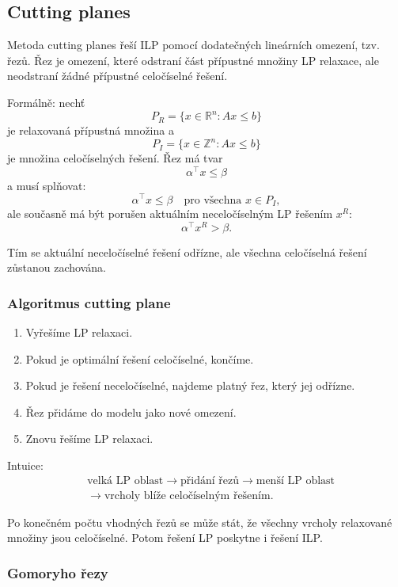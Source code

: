 \subsection{Cutting planes}

Metoda cutting planes řeší ILP pomocí dodatečných lineárních omezení, tzv. řezů. Řez je omezení,
které odstraní část přípustné množiny LP relaxace, ale neodstraní žádné přípustné celočíselné řešení.

Formálně: nechť
\[
P_R=\{x\in\mathbb{R}^n:Ax\le b\}
\]
je relaxovaná přípustná množina a
\[
P_I=\{x\in\mathbb{Z}^n:Ax\le b\}
\]
je množina celočíselných řešení. Řez má tvar
\[
\alpha^\top x\le \beta
\]
a musí splňovat:
\[
\alpha^\top x\le \beta \quad \text{pro všechna } x\in P_I,
\]
ale současně má být porušen aktuálním neceločíselným LP řešením $x^R$:
\[
\alpha^\top x^R> \beta.
\]

Tím se aktuální neceločíselné řešení odřízne, ale všechna celočíselná řešení zůstanou zachována.

\subsubsection{Algoritmus cutting plane}

\begin{enumerate}
    \item Vyřešíme LP relaxaci.
    \item Pokud je optimální řešení celočíselné, končíme.
    \item Pokud je řešení neceločíselné, najdeme platný řez, který jej odřízne.
    \item Řez přidáme do modelu jako nové omezení.
    \item Znovu řešíme LP relaxaci.
\end{enumerate}

Intuice:
\[
\begin{aligned}
&\text{velká LP oblast}
\rightarrow \text{přidání řezů}
\rightarrow \text{menší LP oblast}\\
&\rightarrow \text{vrcholy blíže celočíselným řešením}.
\end{aligned}
\]

Po konečném počtu vhodných řezů se může stát, že všechny vrcholy relaxované množiny jsou
celočíselné. Potom řešení LP poskytne i řešení ILP.

\subsubsection{Gomoryho řezy}

